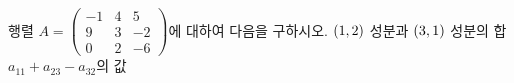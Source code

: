 행렬 $A=\begin{pmatrix} -1 & 4 & 5 \\ 9 & 3 & -2 \\ 0 & 2 & -6 \end{pmatrix}$에 대하여 다음을 구하시오.
 $(1{,}\mkern3mu\mathopen{}2)$ 성분과 $(3{,}\mkern3mu\mathopen{}1)$ 성분의 합
 $a_{11}+a_{23}-a_{32}$의 값
